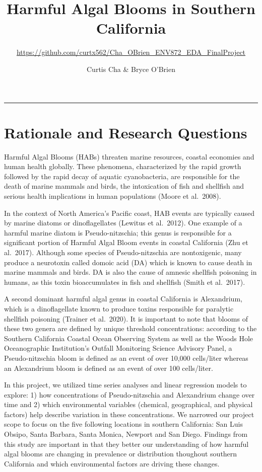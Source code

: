 \documentclass[
  12pt,
]{article}
\title{Harmful Algal Blooms in Southern California}
\subtitle{\url{https://github.com/curtx562/Cha_OBrien_ENV872_EDA_FinalProject}}
\author{Curtis Cha \& Bryce O'Brien}
\date{}
\begin{document}
\maketitle

\newpage
\tableofcontents
\newpage
\listoftables 
\newpage
\listoffigures
\newpage

\begin{center}\rule{0.5\linewidth}{0.5pt}\end{center}

\hypertarget{rationale-and-research-questions}{%
\section{Rationale and Research
Questions}\label{rationale-and-research-questions}}

Harmful Algal Blooms (HABs) threaten marine resources, coastal economies
and human health globally. These phenomena, characterized by the rapid
growth followed by the rapid decay of aquatic cyanobacteria, are
responsible for the death of marine mammals and birds, the intoxication
of fish and shellfish and serious health implications in human
populations (Moore et al.~2008).

In the context of North America's Pacific coast, HAB events are
typically caused by marine diatoms or dinoflagellates (Lewitus et
al.~2012). One example of a harmful marine diatom is Pseudo-nitzschia;
this genus is responsible for a significant portion of Harmful Algal
Bloom events in coastal California (Zhu et al.~2017). Although some
species of Pseudo-nitzschia are nontoxigenic, many produce a neurotoxin
called domoic acid (DA) which is known to cause death in marine mammals
and birds. DA is also the cause of amnesic shellfish poisoning in
humans, as this toxin bioaccumulates in fish and shellfish (Smith et
al.~2017).

A second dominant harmful algal genus in coastal California is
Alexandrium, which is a dinoflagellate known to produce toxins
responsible for paralytic shellfish poisoning (Trainer et al.~2020). It
is important to note that blooms of these two genera are defined by
unique threshold concentrations: according to the Southern California
Coastal Ocean Observing System as well as the Woods Hole Oceanographic
Institution's Outfall Monitoring Science Advisory Panel, a
Pseudo-nitzschia bloom is defined as an event of over 10,000 cells/liter
whereas an Alexandrium bloom is defined as an event of over 100
cells/liter.

In this project, we utilized time series analyses and linear regression
models to explore: 1) how concentrations of Pseudo-nitzschia and
Alexandrium change over time and 2) which environmental variables
(chemical, geographical, and physical factors) help describe variation
in these concentrations. We narrowed our project scope to focus on the
five following locations in southern California: San Luis Obsipo, Santa
Barbara, Santa Monica, Newport and San Diego. Findings from this study
are important in that they better our understanding of how harmful algal
blooms are changing in prevalence or distribution thoughout southern
California and which environmental factors are driving these changes.
\end{document}
